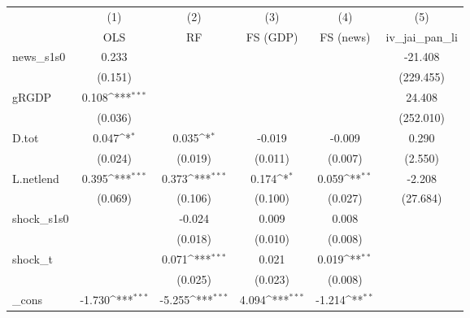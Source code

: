 {
\def\sym#1{\ifmmode^{#1}\else\(^{#1}\)\fi}
\begin{tabular}{l*{5}{c}}
\toprule
            &\multicolumn{1}{c}{(1)}&\multicolumn{1}{c}{(2)}&\multicolumn{1}{c}{(3)}&\multicolumn{1}{c}{(4)}&\multicolumn{1}{c}{(5)}\\
            &\multicolumn{1}{c}{OLS}&\multicolumn{1}{c}{RF}&\multicolumn{1}{c}{FS (GDP)}&\multicolumn{1}{c}{FS (news)}&\multicolumn{1}{c}{iv\_jai\_pan\_li}\\
\midrule
news\_s1s0   &       0.233         &                     &                     &                     &     -21.408         \\
            &     (0.151)         &                     &                     &                     &   (229.455)         \\
\addlinespace
gRGDP       &       0.108\sym{***}&                     &                     &                     &      24.408         \\
            &     (0.036)         &                     &                     &                     &   (252.010)         \\
\addlinespace
D.tot       &       0.047\sym{*}  &       0.035\sym{*}  &      -0.019         &      -0.009         &       0.290         \\
            &     (0.024)         &     (0.019)         &     (0.011)         &     (0.007)         &     (2.550)         \\
\addlinespace
L.netlend   &       0.395\sym{***}&       0.373\sym{***}&       0.174\sym{*}  &       0.059\sym{**} &      -2.208         \\
            &     (0.069)         &     (0.106)         &     (0.100)         &     (0.027)         &    (27.684)         \\
\addlinespace
shock\_s1s0  &                     &      -0.024         &       0.009         &       0.008         &                     \\
            &                     &     (0.018)         &     (0.010)         &     (0.008)         &                     \\
\addlinespace
shock\_t     &                     &       0.071\sym{***}&       0.021         &       0.019\sym{**} &                     \\
            &                     &     (0.025)         &     (0.023)         &     (0.008)         &                     \\
\addlinespace
\_cons      &      -1.730\sym{***}&      -5.255\sym{***}&       4.094\sym{***}&      -1.214\sym{**} &                     \\

\end{tabular}}
